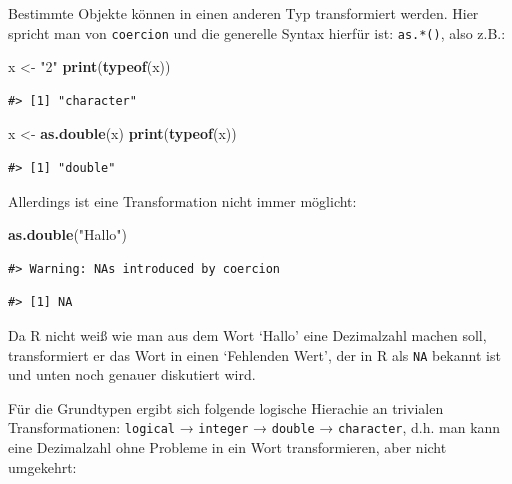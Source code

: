 \documentclass[]{tufte-book}
\newenvironment{Shaded}{}{}
\newcommand{\KeywordTok}[1]{\textcolor[rgb]{0.00,0.44,0.13}{\textbf{#1}}}
\newcommand{\StringTok}[1]{\textcolor[rgb]{0.25,0.44,0.63}{#1}}
\newcommand{\NormalTok}[1]{#1}
\begin{document}
Bestimmte Objekte können in einen anderen Typ transformiert werden. Hier
spricht man von \texttt{coercion} und die generelle Syntax hierfür ist:
\texttt{as.*()}, also z.B.:

\begin{Shaded}
\begin{Highlighting}[]
\NormalTok{x <-}\StringTok{ "2"}
\KeywordTok{print}\NormalTok{(}\KeywordTok{typeof}\NormalTok{(x))}
\end{Highlighting}
\end{Shaded}

\begin{verbatim}
#> [1] "character"
\end{verbatim}

\begin{Shaded}
\begin{Highlighting}[]
\NormalTok{x <-}\StringTok{ }\KeywordTok{as.double}\NormalTok{(x)}
\KeywordTok{print}\NormalTok{(}\KeywordTok{typeof}\NormalTok{(x))}
\end{Highlighting}
\end{Shaded}

\begin{verbatim}
#> [1] "double"
\end{verbatim}

Allerdings ist eine Transformation nicht immer möglicht:

\begin{Shaded}
\begin{Highlighting}[]
\KeywordTok{as.double}\NormalTok{(}\StringTok{"Hallo"}\NormalTok{)}
\end{Highlighting}
\end{Shaded}

\begin{verbatim}
#> Warning: NAs introduced by coercion
\end{verbatim}

\begin{verbatim}
#> [1] NA
\end{verbatim}

Da R nicht weiß wie man aus dem Wort `Hallo' eine Dezimalzahl machen
soll, transformiert er das Wort in einen `Fehlenden Wert', der in R als
\texttt{NA} bekannt ist und unten noch genauer diskutiert wird.

Für die Grundtypen ergibt sich folgende logische Hierachie an trivialen
Transformationen: \texttt{logical} → \texttt{integer} → \texttt{double}
→ \texttt{character}, d.h. man kann eine Dezimalzahl ohne Probleme in
ein Wort transformieren, aber nicht umgekehrt:
\end{document}
